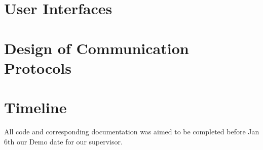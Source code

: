 \documentclass[12pt, titlepage]{article}
\begin{document}

\section{User Interfaces}


\section{Design of Communication Protocols}


\section{Timeline}

All code and corresponding documentation was aimed to be completed before Jan 6th our Demo date for our supervisor.
\end{document}
